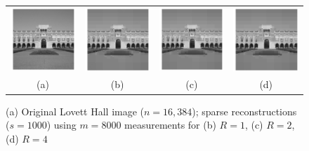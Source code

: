 \begin{figure}[t!]
	\begin{center}
		\begin{tabular}{cccc}
		\includegraphics[width=0.24\linewidth]{./fig/lovett_original.pdf} &
		\includegraphics[width=0.24\linewidth]{./fig/lovett_r1.pdf} &
		\includegraphics[width=0.24\linewidth]{./fig/lovett_r2.pdf} &
		\includegraphics[width=0.24\linewidth]{./fig/lovett_r4.pdf}  \\
		(a) & (b) & (c) & (d)
	\end{tabular}
	\end{center}
	\caption{{(a) Original Lovett Hall image ($n=16,384$); sparse reconstructions ($s=1000$) using $m=8000$ measurements for (b) $R=1$, (c) $R=2$, (d) $R=4$}}
	\label{fig:lovett}
\end{figure}




